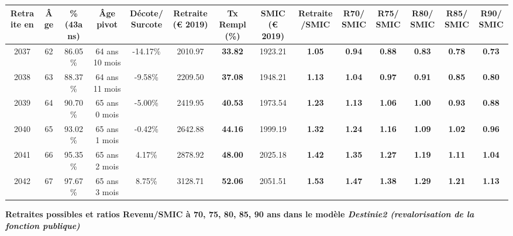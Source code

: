 \begin{adjustbox}{max width=\textwidth} 
\begin{tabular}[htb]{|c|c||c|c|c||c|c||c|c||c|c|c|c|c|} 
\hline 
 Retraite en &  Âge &  \%(43ans) &  Âge pivot &  Décote/Surcote &  Retraite (\euro{} 2019) &  Tx Rempl(\%) &  SMIC (\euro{} 2019) &  Retraite/SMIC &  R70/SMIC &  R75/SMIC &  R80/SMIC &  R85/SMIC &  R90/SMIC \\ 
\hline \hline 
 2037 &  62 &  86.05\% &  64 ans 10 mois &  -14.17\% &  2010.97 &  {\bf 33.82} &  1923.21 &  {\bf 1.05} &  {\bf {\color{red} 0.94}} &  {\bf {\color{red} 0.88}} &  {\bf {\color{red} 0.83}} &  {\bf {\color{red} 0.78}} &  {\bf {\color{red} 0.73}} \\ 
\hline 
 2038 &  63 &  88.37\% &  64 ans 11 mois &  -9.58\% &  2209.50 &  {\bf 37.08} &  1948.21 &  {\bf 1.13} &  {\bf 1.04} &  {\bf {\color{red} 0.97}} &  {\bf {\color{red} 0.91}} &  {\bf {\color{red} 0.85}} &  {\bf {\color{red} 0.80}} \\ 
\hline 
 2039 &  64 &  90.70\% &  65 ans 0 mois &  -5.00\% &  2419.95 &  {\bf 40.53} &  1973.54 &  {\bf 1.23} &  {\bf 1.13} &  {\bf 1.06} &  {\bf {\color{red} 1.00}} &  {\bf {\color{red} 0.93}} &  {\bf {\color{red} 0.88}} \\ 
\hline 
 2040 &  65 &  93.02\% &  65 ans 1 mois &  -0.42\% &  2642.88 &  {\bf 44.16} &  1999.19 &  {\bf 1.32} &  {\bf 1.24} &  {\bf 1.16} &  {\bf 1.09} &  {\bf 1.02} &  {\bf {\color{red} 0.96}} \\ 
\hline 
 2041 &  66 &  95.35\% &  65 ans 2 mois &  4.17\% &  2878.92 &  {\bf 48.00} &  2025.18 &  {\bf 1.42} &  {\bf 1.35} &  {\bf 1.27} &  {\bf 1.19} &  {\bf 1.11} &  {\bf 1.04} \\ 
\hline 
 2042 &  67 &  97.67\% &  65 ans 3 mois &  8.75\% &  3128.71 &  {\bf 52.06} &  2051.51 &  {\bf 1.53} &  {\bf 1.47} &  {\bf 1.38} &  {\bf 1.29} &  {\bf 1.21} &  {\bf 1.13} \\ 
\hline 
\hline 
\end{tabular} 
\end{adjustbox} 
 
 \vspace{0.1cm} 
{\bf \noindent Retraites possibles et ratios Revenu/SMIC à 70, 75, 80, 85, 90 ans dans le modèle \emph{Destinie2 (revalorisation de la fonction publique)}}  
 
